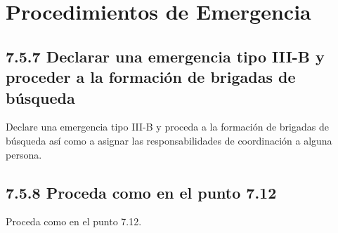 \section*{Procedimientos de Emergencia}

\subsection*{7.5.7 Declarar una emergencia tipo III-B y proceder a la formación de brigadas de búsqueda}
Declare una emergencia tipo III-B y proceda a la formación de brigadas de búsqueda así como a asignar las responsabilidades de coordinación a alguna persona.

\subsection*{7.5.8 Proceda como en el punto 7.12}
Proceda como en el punto 7.12.
